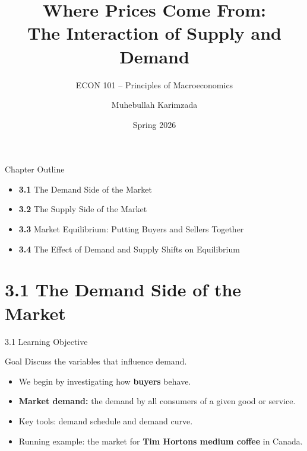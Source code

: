 \documentclass[aspectratio=169]{beamer}
\title{\textbf{Where Prices Come From:\\The Interaction of Supply and Demand}}
\subtitle{{\large ECON 101 -- Principles of Macroeconomics}}
\author{Muhebullah Karimzada}
\date{Spring 2026}
\begin{document}

\begin{frame}[plain]
  \titlepage
\end{frame}

\begin{frame}{Chapter Outline}
\transfade
\begin{itemize}
  \item \textbf{3.1} The Demand Side of the Market
  \item \textbf{3.2} The Supply Side of the Market
  \item \textbf{3.3} Market Equilibrium: Putting Buyers and Sellers Together
  \item \textbf{3.4} The Effect of Demand and Supply Shifts on Equilibrium
\end{itemize}
\end{frame}

\section{3.1 The Demand Side of the Market}

\begin{frame}{3.1 Learning Objective}
\transfade
\begin{block}{Goal}
Discuss the variables that influence demand.
\end{block}
\begin{itemize}
  \item We begin by investigating how \textbf{buyers} behave.
  \item \textbf{Market demand:} the demand by all consumers of a given good or service.
  \item Key tools: demand schedule and demand curve.
  \item Running example: the market for \textbf{Tim Hortons medium coffee} in Canada.
\end{itemize}
\end{frame}
\end{document}

